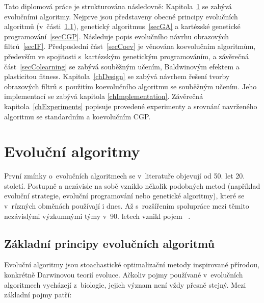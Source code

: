 Tato diplomová práce je strukturována následovně: Kapitola~\ref{chEA} se zabývá evolučními algoritmy. Nejprve jsou představeny obecné principy evolučních algoritmů (v~části~\ref{secEAGeneral}), genetický algoritmus~\ref{secGA} a kartézské genetické programování~\ref{secCGP}. Následuje popis evolučního návrhu obrazových filtrů~\ref{secIF}. Předposlední část~\ref{secCoev} je věnována koevolučním algoritmům, především ve spojitosti s~kartézským genetickým programováním, a závěrečná část~\ref{secColearning} se zabývá souběžným učením, Baldwinovým efektem a plasticitou fitness. Kapitola~\ref{chDesign} se zabývá návrhem řešení tvorby obrazových filtrů s~použitím koevolučního algoritmu se souběžným učením. Jeho implementací se zabývá kapitola \ref{chImplementation}. Závěrečná kapitola~\ref{chExperiments} popisuje provedené experimenty a srovnání navrženého algoritmu se standardním a koevolučním CGP.

\chapter{Evoluční algoritmy}
\label{chEA}

První zmínky o~evolučních algoritmech se v~literatuře objevují od 50. let 20. století. Postupně a nezávisle na sobě vzniklo několik podobných metod (například evoluční strategie, evoluční programování nebo genetické algoritmy), které se v~různých obměnách používají i dnes. Až s~rozšířením spolupráce mezi těmito nezávislými výzkumnými týmy v~90. letech vznikl pojem ~\cite{Modra}.

\section{Základní principy evolučních algoritmů}
\label{secEAGeneral}

Evoluční algoritmy jsou stoachastické optimalizační metody inspirované přírodou, konkrétně Darwinovou teorií evoluce. Ačkoliv pojmy používané v~evolučních algoritmech vycházejí z~biologie, jejich význam není vždy přesně stejný. Mezi základní pojmy patří:

